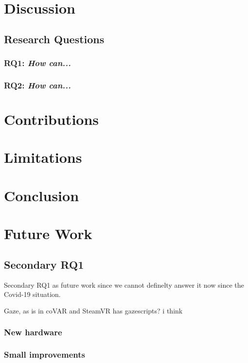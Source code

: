 \section{Discussion}


\subsection{Research Questions}  \label{RQDiscussion}


\subsubsection{RQ1: \textit{How can...}} 


\subsubsection{RQ2: \textit{How can...}}


\section{Contributions}



\section{Limitations}




\section{Conclusion}


\section{Future Work}
\label{section:futureWork}

\subsection{Secondary RQ1}
Secondary RQ1 as future work since we cannot definelty answer it now since the Covid-19 situation.

Gaze, as is in coVAR and SteamVR has gazescripts? i think  

\subsubsection{New hardware}

\subsubsection{Small improvements}

\cleardoublepage